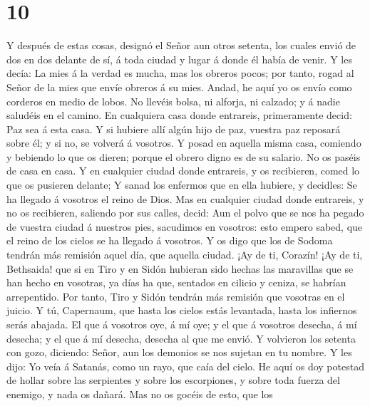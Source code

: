 \hypertarget{section-9}{%
\section{10}\label{section-9}}

 Y después de estas cosas, designó el Señor aun otros
setenta, los cuales envió de dos en dos delante de sí, á toda ciudad y
lugar á donde él había de venir.  Y les decía: La mies á
la verdad es mucha, mas los obreros pocos; por tanto, rogad al Señor de
la mies que envíe obreros á su mies.  Andad, he aquí yo os
envío como corderos en medio de lobos.  No llevéis bolsa,
ni alforja, ni calzado; y á nadie saludéis en el camino. 
En cualquiera casa donde entrareis, primeramente decid: Paz sea á esta
casa.  Y si hubiere allí algún hijo de paz, vuestra paz
reposará sobre él; y si no, se volverá á vosotros.  Y
posad en aquella misma casa, comiendo y bebiendo lo que os dieren;
porque el obrero digno es de su salario. No os paséis de casa en casa.
 Y en cualquier ciudad donde entrareis, y os recibieren,
comed lo que os pusieren delante;  Y sanad los enfermos
que en ella hubiere, y decidles: Se ha llegado á vosotros el reino de
Dios.  Mas en cualquier ciudad donde entrareis, y no os
recibieren, saliendo por sus calles, decid:  Aun el polvo
que se nos ha pegado de vuestra ciudad á nuestros pies, sacudimos en
vosotros: esto empero sabed, que el reino de los cielos se ha llegado á
vosotros.  Y os digo que los de Sodoma tendrán más
remisión aquel día, que aquella ciudad.  ¡Ay de ti,
Corazín! ¡Ay de ti, Bethsaida! que si en Tiro y en Sidón hubieran sido
hechas las maravillas que se han hecho en vosotras, ya días ha que,
sentados en cilicio y ceniza, se habrían arrepentido. 
Por tanto, Tiro y Sidón tendrán más remisión que vosotras en el juicio.
 Y tú, Capernaum, que hasta los cielos estás levantada,
hasta los infiernos serás abajada.  El que á vosotros
oye, á mí oye; y el que á vosotros desecha, á mí desecha; y el que á mí
desecha, desecha al que me envió.  Y volvieron los
setenta con gozo, diciendo: Señor, aun los demonios se nos sujetan en tu
nombre.  Y les dijo: Yo veía á Satanás, como un rayo, que
caía del cielo.  He aquí os doy potestad de hollar sobre
las serpientes y sobre los escorpiones, y sobre toda fuerza del enemigo,
y nada os dañará.  Mas no os gocéis de esto, que los

